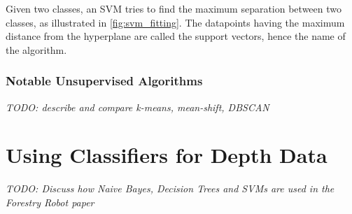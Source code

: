 \documentclass[lit_review.tex]{subfiles}
\begin{document}
Given two classes, an SVM tries to find the maximum separation between two classes, as illustrated in \autoref{fig:svm_fitting}. The datapoints having the maximum distance from the hyperplane are called the support vectors, hence the name of the algorithm.



\subsubsection{Notable Unsupervised Algorithms}
\textit{TODO: describe and compare k-means, mean-shift, DBSCAN}


\section{Using Classifiers for Depth Data}
\textit{TODO: Discuss how Naive Bayes, Decision Trees and SVMs are used in the Forestry Robot paper \cite{forestry}}
\end{document}
